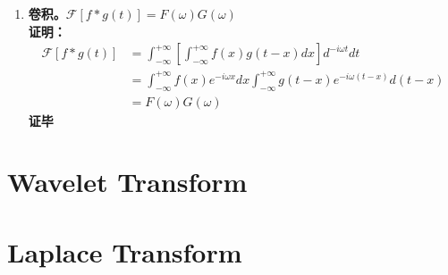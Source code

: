 \begin{enumerate}
		\item \textbf{卷积。$\mathcal{F}[f*g(t)]=F(\omega)G(\omega)$}	\\
		\textbf{证明：}	\\
		\begin{equation}
		\begin{aligned}
			\mathcal{F}[f*g(t)]
			&=\int_{-\infty}^{+\infty}[\int_{-\infty}^{+\infty}f(x)g(t-x)dx]d^{-i\omega t}dt	\\
			&=\int_{-\infty}^{+\infty}f(x)e^{-i\omega x}dx\int_{-\infty}^{+\infty}g(t-x)e^{-i\omega(t-x)}d(t-x)	\\
			&=F(\omega)G(\omega)
		\end{aligned}
		\end{equation}
		\hfill{\textbf{证毕}}
	\end{enumerate}

\section{Wavelet Transform}

\section{Laplace Transform}

